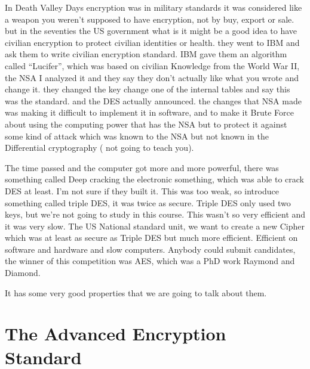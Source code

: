 In Death Valley Days encryption was in military standards it was considered like a weapon you weren't supposed to have encryption, not by buy, export or sale. but in the seventies the US government what is it might be a good idea to have civilian encryption to protect civilian identities or health. they went to IBM and ask them to write civilian encryption standard. IBM gave them an algorithm called “Lucifer”, which was based on civilian Knowledge from the World War II, the NSA I analyzed it and they say they don't actually like what you wrote and change it. they changed the key change one of the internal tables and say this was the standard. and the DES actually announced. the changes that NSA made was making it difficult to implement it in software, and to make it Brute Force about using the computing power that has the NSA but to protect it against some kind of attack which was known to the NSA but not known in the Differential cryptography ( not going to teach you).

The time passed and the computer got more and more powerful, there was something called Deep cracking the electronic something, which was able to crack DES at least. I'm not sure if they built it. This was too weak, so introduce something called triple DES, it was twice as secure. Triple DES only used two keys, but we're not going to study in this course. This wasn't so very efficient and it was very slow. The US National standard unit, we want to create a new Cipher which was at least as secure as Triple DES but much more efficient. Efficient on software and hardware and slow computers. Anybody could submit candidates, the winner of this competition was AES, which was a PhD work Raymond and Diamond.

It has some very good properties that we are going to talk about them.

\section{The Advanced Encryption Standard} 

